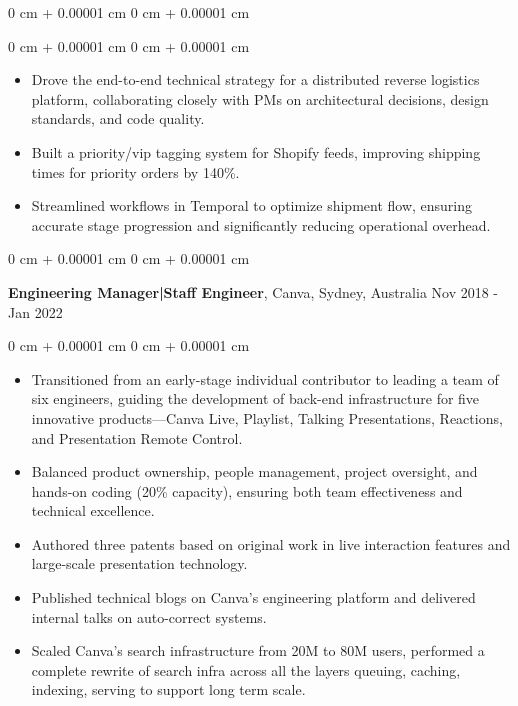 \documentclass[10pt, letterpaper]{article}
\newenvironment{highlights}{
    \begin{itemize}[
        topsep=0.10 cm,
        parsep=0.10 cm,
        partopsep=0pt,
        itemsep=0pt,
        leftmargin=0 cm + 10pt
    ]
}{
    \end{itemize}
} %
\newenvironment{onecolentry}{
    \begin{adjustwidth}{
        0 cm + 0.00001 cm
    }{
        0 cm + 0.00001 cm
    }
}{
    \end{adjustwidth}
} %
\newenvironment{twocolentry}[2][]{
    \onecolentry
    \def\secondColumn{#2}
    \setcolumnwidth{\fill, 4.5 cm}
    \begin{paracol}{2}
}{
    \switchcolumn \raggedleft \secondColumn
    \end{paracol}
    \endonecolentry
} %
\begin{document}
\begin{onecolentry}
\begin{highlights}
        \vspace{0.10 cm}
        \begin{onecolentry}
            \begin{highlights}
                \item Drove the end-to-end technical strategy for a distributed reverse logistics platform, collaborating closely with PMs on architectural decisions, design standards, and code quality.
                \item Built a priority/vip tagging system for Shopify feeds, improving shipping times for priority orders by 140\%.
                \item Streamlined workflows in Temporal to optimize shipment flow, ensuring accurate stage progression and significantly reducing operational overhead.
            \end{highlights}
        \end{onecolentry}
        
        \vspace{0.15 cm}

        \begin{twocolentry}{
            Nov 2018 - Jan 2022
        }
            \textbf{Engineering Manager|Staff Engineer}, Canva, Sydney, Australia\end{twocolentry}

        \vspace{0.10 cm}
        \begin{onecolentry}
            \begin{highlights}
                \item Transitioned from an early-stage individual contributor to leading a team of six engineers, guiding the development of back-end infrastructure for five innovative products—Canva Live, Playlist, Talking Presentations, Reactions, and Presentation Remote Control.
                \item Balanced product ownership, people management, project oversight, and hands-on coding (20\% capacity), ensuring both team effectiveness and technical excellence.
                \item Authored three patents based on original work in live interaction features and large-scale presentation technology.
                \item Published technical blogs on Canva's engineering platform and delivered internal talks on auto-correct systems.
                \item Scaled Canva's search infrastructure from 20M to 80M users, performed a complete rewrite of search infra across all the layers queuing, caching, indexing, serving to support long term scale.
            \end{highlights}
        \end{onecolentry}


\end{highlights}
\end{onecolentry}
\end{document}
